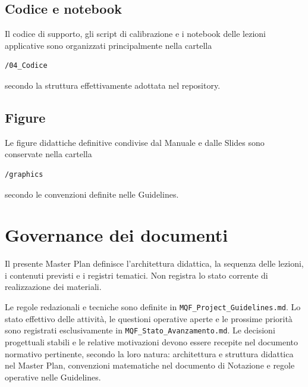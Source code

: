 \documentclass[12pt,a4paper]{article}%
\newcommand{\1}{\mathbf{1}}
\begin{document}
\subsection{Codice e notebook}

Il codice di supporto, gli script di calibrazione e i notebook delle lezioni
applicative sono organizzati principalmente nella cartella

\begin{verbatim}
/04_Codice
\end{verbatim}

secondo la struttura effettivamente adottata nel repository.

\subsection{Figure}

Le figure didattiche definitive condivise dal Manuale e dalle Slides sono
conservate nella cartella

\begin{verbatim}
/graphics
\end{verbatim}

secondo le convenzioni definite nelle Guidelines.

\section{Governance dei documenti}

Il presente Master Plan definisce l'architettura didattica, la sequenza delle
lezioni, i contenuti previsti e i registri tematici. Non registra lo stato
corrente di realizzazione dei materiali.

Le regole redazionali e tecniche sono definite in
\texttt{MQF\_Project\_Guidelines.md}. Lo stato effettivo delle attivit\`{a},
le questioni operative aperte e le prossime priorit\`{a} sono registrati
esclusivamente in \texttt{MQF\_Stato\_Avanzamento.md}. Le decisioni progettuali stabili e le relative motivazioni devono essere
recepite nel documento normativo pertinente, secondo la loro natura:
architettura e struttura didattica nel Master Plan, convenzioni matematiche
nel documento di Notazione e regole operative nelle Guidelines.
\end{document}
